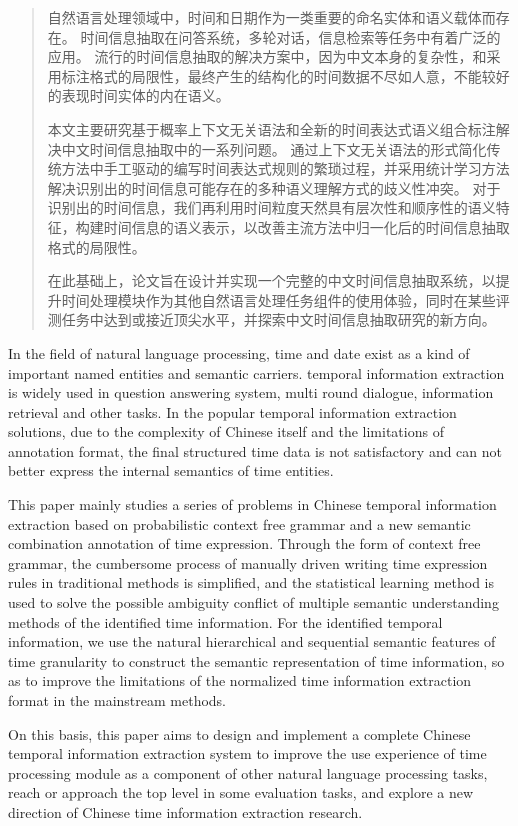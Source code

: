 

\begin{abstract}
  自然语言处理领域中，时间和日期作为一类重要的命名实体和语义载体而存在。
  时间信息抽取在问答系统，多轮对话，信息检索等任务中有着广泛的应用。
  流行的时间信息抽取的解决方案中，因为中文本身的复杂性，和采用标注格式的局限性，最终产生的结构化的时间数据不尽如人意，不能较好的表现时间实体的内在语义。

  本文主要研究基于概率上下文无关语法和全新的时间表达式语义组合标注解决中文时间信息抽取中的一系列问题。
  通过上下文无关语法的形式简化传统方法中手工驱动的编写时间表达式规则的繁琐过程，并采用统计学习方法解决识别出的时间信息可能存在的多种语义理解方式的歧义性冲突。
  对于识别出的时间信息，我们再利用时间粒度天然具有层次性和顺序性的语义特征，构建时间信息的语义表示，以改善主流方法中归一化后的时间信息抽取格式的局限性。

  在此基础上，论文旨在设计并实现一个完整的中文时间信息抽取系统，以提升时间处理模块作为其他自然语言处理任务组件的使用体验，同时在某些评测任务中达到或接近顶尖水平，并探索中文时间信息抽取研究的新方向。
\end{abstract}

\begin{abstract*}
  In the field of natural language processing, time and date exist as a kind of important named entities and semantic carriers.
  temporal information extraction is widely used in question answering system, multi round dialogue, information retrieval and other tasks.
  In the popular temporal information extraction solutions, due to the complexity of Chinese itself and the limitations of annotation format, the final structured time data is not satisfactory and can not better express the internal semantics of time entities.

  This paper mainly studies a series of problems in Chinese temporal information extraction based on probabilistic context free grammar and a new semantic combination annotation of time expression.
  Through the form of context free grammar, the cumbersome process of manually driven writing time expression rules in traditional methods is simplified, and the statistical learning method is used to solve the possible ambiguity conflict of multiple semantic understanding methods of the identified time information.
  For the identified temporal information, we use the natural hierarchical and sequential semantic features of time granularity to construct the semantic representation of time information, so as to improve the limitations of the normalized time information extraction format in the mainstream methods.

  On this basis, this paper aims to design and implement a complete Chinese temporal information extraction system to improve the use experience of time processing module as a component of other natural language processing tasks, reach or approach the top level in some evaluation tasks, and explore a new direction of Chinese time information extraction research.
\end{abstract*}
